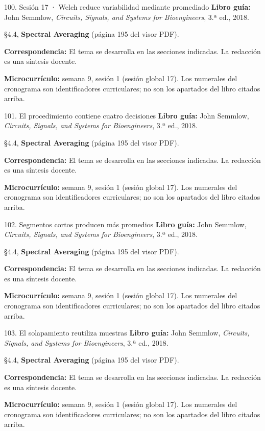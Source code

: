 \documentclass[
  10pt,
  ignorenonframetext,
  aspectratio=169,
  spanish,
]{beamer}
\begin{document}
\begin{frame}{100. Sesión 17 · Welch reduce variabilidad mediante
promediado}
\label{sesiuxf3n-17-welch-reduce-variabilidad-mediante-promediado}
\textbf{Libro guía:} John Semmlow, \emph{Circuits, Signals, and Systems
for Bioengineers}, 3.ª ed., 2018.

§4.4, \textbf{Spectral Averaging} (página 195 del visor PDF).

\textbf{Correspondencia:} El tema se desarrolla en las secciones
indicadas. La redacción es una síntesis docente.

\textbf{Microcurrículo:} semana 9, sesión 1 (sesión global 17). Los
numerales del cronograma son identificadores curriculares; no son los
apartados del libro citados arriba.
\end{frame}

\begin{frame}{101. El procedimiento contiene cuatro decisiones}
\label{el-procedimiento-contiene-cuatro-decisiones}
\textbf{Libro guía:} John Semmlow, \emph{Circuits, Signals, and Systems
for Bioengineers}, 3.ª ed., 2018.

§4.4, \textbf{Spectral Averaging} (página 195 del visor PDF).

\textbf{Correspondencia:} El tema se desarrolla en las secciones
indicadas. La redacción es una síntesis docente.

\textbf{Microcurrículo:} semana 9, sesión 1 (sesión global 17). Los
numerales del cronograma son identificadores curriculares; no son los
apartados del libro citados arriba.
\end{frame}

\begin{frame}{102. Segmentos cortos producen más promedios}
\label{segmentos-cortos-producen-muxe1s-promedios}
\textbf{Libro guía:} John Semmlow, \emph{Circuits, Signals, and Systems
for Bioengineers}, 3.ª ed., 2018.

§4.4, \textbf{Spectral Averaging} (página 195 del visor PDF).

\textbf{Correspondencia:} El tema se desarrolla en las secciones
indicadas. La redacción es una síntesis docente.

\textbf{Microcurrículo:} semana 9, sesión 1 (sesión global 17). Los
numerales del cronograma son identificadores curriculares; no son los
apartados del libro citados arriba.
\end{frame}

\begin{frame}{103. El solapamiento reutiliza muestras}
\label{el-solapamiento-reutiliza-muestras}
\textbf{Libro guía:} John Semmlow, \emph{Circuits, Signals, and Systems
for Bioengineers}, 3.ª ed., 2018.

§4.4, \textbf{Spectral Averaging} (página 195 del visor PDF).

\textbf{Correspondencia:} El tema se desarrolla en las secciones
indicadas. La redacción es una síntesis docente.

\textbf{Microcurrículo:} semana 9, sesión 1 (sesión global 17). Los
numerales del cronograma son identificadores curriculares; no son los
apartados del libro citados arriba.
\end{frame}
\end{document}
